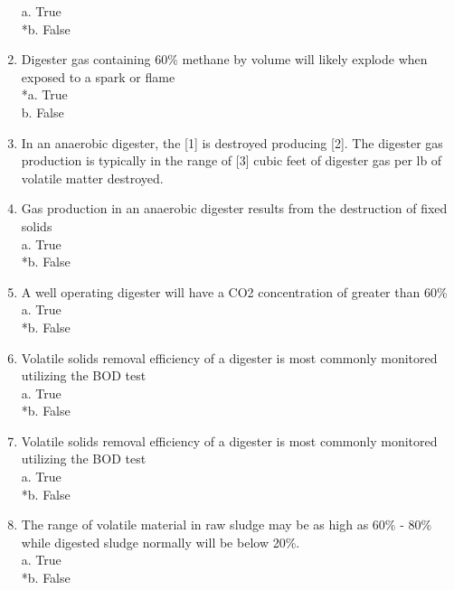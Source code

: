 \begin{enumerate}
a. True \\
*b. False \\

\item  Digester gas containing 60\% methane by volume will likely explode when exposed to a spark or flame \\

*a. True \\
b. False \\

\item  In an anaerobic digester, the [1] is destroyed producing [2].  The digester gas production is typically in the range of [3] cubic feet of digester gas per lb of volatile matter destroyed. \\

\item  Gas production in an anaerobic digester results from the destruction of fixed solids \\

a. True \\
*b. False \\

\item  A well operating digester will have a CO2 concentration of greater than 60\% \\

a. True \\
*b. False \\

\item  Volatile solids removal efficiency of a digester is most commonly monitored utilizing the BOD test\\

a. True \\
*b. False \\

\item  Volatile solids removal efficiency of a digester is most commonly monitored utilizing the BOD test\\

a. True \\
*b. False \\

\item  The range of volatile material in raw sludge may be as high as 60\% - 80\% while digested sludge normally will be below 20\%. \\

a. True \\
*b. False \\


\end{enumerate}

